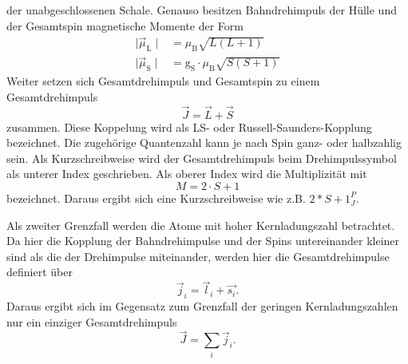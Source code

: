 der unabgeschlossenen Schale.
Genauso besitzen Bahndrehimpuls der Hülle und der Gesamtspin magnetische Momente
der Form
\begin{align}
  \mid \vec{\mu}_\text{L} \mid &= \mu_\text{B} \sqrt{L\left(L+1 \right)} \\
  \mid \vec{\mu}_\text{S} \mid &= \text{g}_\text{S}\cdot \mu_\text{B} \sqrt{S\left(S+1 \right)}
  \label{eqn:gesamtmomente}
\end{align}
Weiter setzen sich Gesamtdrehimpuls und Gesamtspin zu einem Gesamtdrehimpuls
\begin{equation}
  \vec{J} = \vec{L} + \vec{S}
  \label{eqn:gesamtdrehimpuls}
\end{equation}
zusammen. Diese Koppelung wird als LS- oder Russell-Saunders-Kopplung bezeichnet.
Die zugehörige Quantenzahl kann je nach Spin ganz- oder halbzahlig sein. Als
Kurzschreibweise wird der Gesamtdrehimpuls beim Drehimpulssymbol als unterer Index
geschrieben. Als oberer Index wird die Multiplizität mit
\begin{equation}
  M = 2\cdot S + 1
\end{equation}
bezeichnet. Daraus ergibt sich eine Kurzschreibweise wie z.B. ${2*S+1}^P_J$.

Als zweiter Grenzfall werden die Atome mit hoher Kernladungszahl betrachtet.
Da hier die Kopplung der Bahndrehimpulse und der Spins untereinander kleiner sind
als die der Drehimpulse miteinander, werden hier die Gesamtdrehimpulse definiert
über
\begin{equation}
  \vec{j}_i = \vec{l}_i + \vec{s_i}.
  \label{eqn:gesamt}
\end{equation}
Daraus ergibt sich im Gegensatz zum Grenzfall der geringen Kernladungszahlen nur
ein einziger Gesamtdrehimpuls
\begin{equation}
  \vec{J} = \sum_i \vec{j}_i.
  \label{eqn:Gesamtdrehimpuls}
\end{equation}

